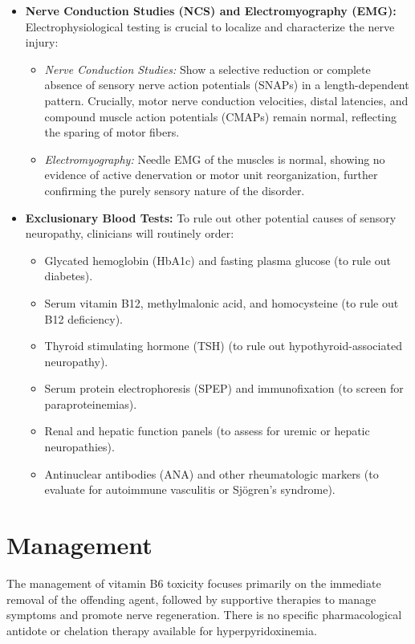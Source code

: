\begin{itemize}
    \item \textbf{Nerve Conduction Studies (NCS) and Electromyography (EMG):} Electrophysiological testing is crucial to localize and characterize the nerve injury:
    \begin{itemize}
        \item \textit{Nerve Conduction Studies:} Show a selective reduction or complete absence of sensory nerve action potentials (SNAPs) in a length-dependent pattern. Crucially, motor nerve conduction velocities, distal latencies, and compound muscle action potentials (CMAPs) remain normal, reflecting the sparing of motor fibers.
        \item \textit{Electromyography:} Needle EMG of the muscles is normal, showing no evidence of active denervation or motor unit reorganization, further confirming the purely sensory nature of the disorder.
    \end{itemize}
    \item \textbf{Exclusionary Blood Tests:} To rule out other potential causes of sensory neuropathy, clinicians will routinely order:
    \begin{itemize}
        \item Glycated hemoglobin (HbA1c) and fasting plasma glucose (to rule out diabetes).
        \item Serum vitamin B12, methylmalonic acid, and homocysteine (to rule out B12 deficiency).
        \item Thyroid stimulating hormone (TSH) (to rule out hypothyroid-associated neuropathy).
        \item Serum protein electrophoresis (SPEP) and immunofixation (to screen for paraproteinemias).
        \item Renal and hepatic function panels (to assess for uremic or hepatic neuropathies).
        \item Antinuclear antibodies (ANA) and other rheumatologic markers (to evaluate for autoimmune vasculitis or Sj\"{o}gren's syndrome).
    \end{itemize}
\end{itemize}

\section*{Management}
The management of vitamin B6 toxicity focuses primarily on the immediate removal of the offending agent, followed by supportive therapies to manage symptoms and promote nerve regeneration. There is no specific pharmacological antidote or chelation therapy available for hyperpyridoxinemia.

